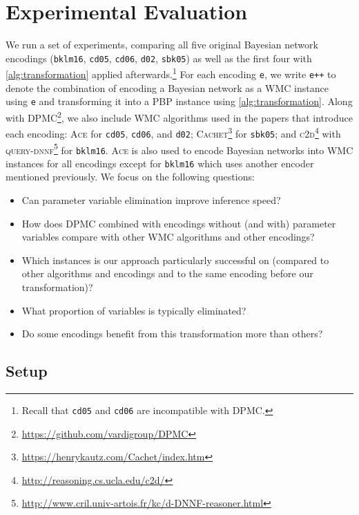 \section{Experimental Evaluation}

We run a set of experiments, comparing all five original Bayesian network
encodings (\texttt{bklm16}, \texttt{cd05}, \texttt{cd06}, \texttt{d02},
\texttt{sbk05}) as well as the first four with \cref{alg:transformation} applied
afterwards.\footnote{Recall that \texttt{cd05} and \texttt{cd06} are
  incompatible with \textsc{DPMC}.} For each encoding \texttt{e}, we write
\texttt{e++} to denote the combination of encoding a Bayesian network as a WMC
instance using \texttt{e} and transforming it into a PBP instance using
\cref{alg:transformation}. Along with
\textsc{DPMC}\footnote{\url{https://github.com/vardigroup/DPMC}}, we also
include WMC algorithms used in the papers that introduce each encoding:
\textsc{Ace} for \texttt{cd05}, \texttt{cd06}, and \texttt{d02};
\textsc{Cachet}\footnote{\url{https://henrykautz.com/Cachet/index.htm}}
\citep{DBLP:conf/sat/SangBBKP04} for \texttt{sbk05}; and
\textsc{c2d}\footnote{\url{http://reasoning.cs.ucla.edu/c2d/}}
\citep{DBLP:conf/ecai/Darwiche04} with
\textsc{query-dnnf}\footnote{\url{http://www.cril.univ-artois.fr/kc/d-DNNF-reasoner.html}}
for \texttt{bklm16}. \textsc{Ace} is also used to encode Bayesian networks into
WMC instances for all encodings except for \texttt{bklm16} which uses another
encoder mentioned previously. We focus on the following questions:
\begin{itemize}
  \item Can parameter variable elimination improve inference speed?
  \item How does \textsc{DPMC} combined with encodings without (and with)
        parameter variables compare with other WMC algorithms and other
        encodings?
  \item Which instances is our approach particularly successful on (compared to
        other algorithms and encodings and to the same encoding before our
        transformation)?
  \item What proportion of variables is typically eliminated?
  \item Do some encodings benefit from this transformation more than others?
\end{itemize}

\subsection{Setup}

